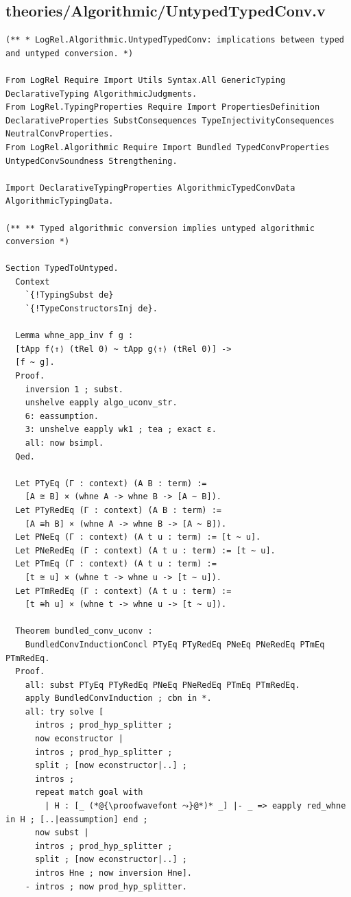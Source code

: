 \documentclass[10pt,a4paper]{amsart}
\begin{document}
\subsection*{theories/Algorithmic/UntypedTypedConv.v}
\begin{lstlisting}
(** * LogRel.Algorithmic.UntypedTypedConv: implications between typed and untyped conversion. *)

From LogRel Require Import Utils Syntax.All GenericTyping DeclarativeTyping AlgorithmicJudgments.
From LogRel.TypingProperties Require Import PropertiesDefinition DeclarativeProperties SubstConsequences TypeInjectivityConsequences NeutralConvProperties.
From LogRel.Algorithmic Require Import Bundled TypedConvProperties  UntypedConvSoundness Strengthening.

Import DeclarativeTypingProperties AlgorithmicTypedConvData AlgorithmicTypingData.

(** ** Typed algorithmic conversion implies untyped algorithmic conversion *)

Section TypedToUntyped.
  Context
    `{!TypingSubst de}
    `{!TypeConstructorsInj de}.

  Lemma whne_app_inv f g :
  [tApp f⟨↑⟩ (tRel 0) ~ tApp g⟨↑⟩ (tRel 0)] ->
  [f ~ g].
  Proof.
    inversion 1 ; subst.
    unshelve eapply algo_uconv_str.
    6: eassumption.
    3: unshelve eapply wk1 ; tea ; exact ε.
    all: now bsimpl.
  Qed.

  Let PTyEq (Γ : context) (A B : term) := 
    [A ≅ B] × (whne A -> whne B -> [A ~ B]).
  Let PTyRedEq (Γ : context) (A B : term) :=
    [A ≅h B] × (whne A -> whne B -> [A ~ B]).
  Let PNeEq (Γ : context) (A t u : term) := [t ~ u].
  Let PNeRedEq (Γ : context) (A t u : term) := [t ~ u].
  Let PTmEq (Γ : context) (A t u : term) :=
    [t ≅ u] × (whne t -> whne u -> [t ~ u]).
  Let PTmRedEq (Γ : context) (A t u : term) :=
    [t ≅h u] × (whne t -> whne u -> [t ~ u]).

  Theorem bundled_conv_uconv :
    BundledConvInductionConcl PTyEq PTyRedEq PNeEq PNeRedEq PTmEq PTmRedEq.
  Proof.
    all: subst PTyEq PTyRedEq PNeEq PNeRedEq PTmEq PTmRedEq.
    apply BundledConvInduction ; cbn in *.
    all: try solve [
      intros ; prod_hyp_splitter ; 
      now econstructor |
      intros ; prod_hyp_splitter ; 
      split ; [now econstructor|..] ;
      intros ;
      repeat match goal with
        | H : [_ (*@{\proofwavefont ⤳}@*)* _] |- _ => eapply red_whne in H ; [..|eassumption] end ;
      now subst |
      intros ; prod_hyp_splitter ; 
      split ; [now econstructor|..] ;
      intros Hne ; now inversion Hne].
    - intros ; now prod_hyp_splitter.


\end{lstlisting}
\end{document}
